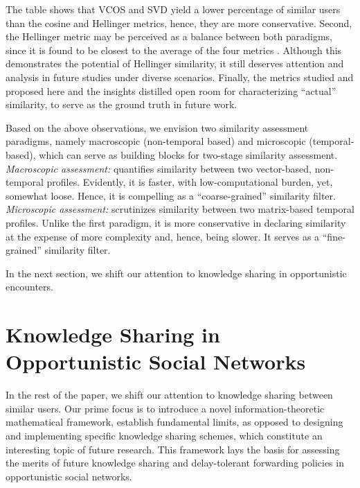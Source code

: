 \documentclass[conference]{IEEEtran}
\theoremstyle{definition}
\begin{document}
The table shows that VCOS and SVD yield a lower percentage of similar users
than the cosine and Hellinger metrics, hence, they are more conservative. 
Second, the Hellinger metric may be perceived as a balance between both 
paradigms, since it is found to be closest to the average of the four 
metrics \cite{Mai13}. Although this demonstrates the potential of Hellinger 
similarity, it still deserves attention and analysis in future studies 
under diverse scenarios. Finally, the metrics studied and proposed here and 
the insights distilled open room for characterizing ``actual'' similarity, 
to serve as the ground truth in future work. 

Based on the above observations, we envision two similarity
assessment paradigms, namely macroscopic (non-temporal based) and
microscopic (temporal-based), which can serve as building blocks for 
two-stage similarity assessment.\\
\textit{Macroscopic assessment:} quantifies
similarity between two vector-based, non-temporal profiles. Evidently,
it is faster, with low-computational burden, yet, somewhat loose. Hence, it is
compelling as a ``coarse-grained'' similarity filter.\\
\textit{Microscopic assessment:} scrutinizes similarity between two
matrix-based temporal profiles. Unlike the first paradigm, it is
more conservative in declaring similarity at the expense of more
complexity and, hence, being slower. It serves as a ``fine-grained'' 
similarity filter.

In the next section, we shift our attention to knowledge sharing in opportunistic encounters.

\vspace{-1.0 cm}
\section{Knowledge Sharing in Opportunistic Social Networks}
\vspace{-0.3 cm}
In the rest of the paper, we shift our attention to knowledge sharing between similar users. Our prime focus is to introduce a novel information-theoretic mathematical framework, establish fundamental limits, as opposed to designing and implementing specific knowledge sharing schemes, which constitute an interesting topic of future research. This framework lays the basis for assessing the merits of future knowledge sharing and delay-tolerant forwarding policies in opportunistic social networks.
\end{document}
